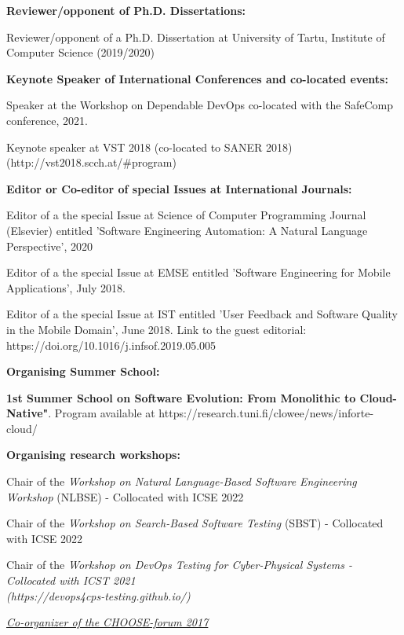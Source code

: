 \documentclass[10pt]{article}
\begin{document}
\textbf{Reviewer/opponent of Ph.D. Dissertations:}
\begin{innerlist}
\item Reviewer/opponent of a Ph.D. Dissertation  at University of Tartu, Institute of Computer Science (2019/2020) \\
	\end{innerlist}

\textbf{Keynote Speaker of International Conferences and co-located events:}
\begin{innerlist}
\item Speaker at the Workshop on Dependable DevOps co-located with the SafeComp conference, 2021.\\
\item Keynote speaker at VST 2018 (co-located to SANER 2018) \\(http://vst2018.scch.at/\#program) 
	\\
\end{innerlist}

\textbf{Editor or Co-editor of special Issues at International Journals:}
\begin{innerlist}
\item Editor of a the special Issue at Science of Computer Programming Journal (Elsevier)  entitled 'Software Engineering Automation: A Natural Language Perspective', 2020 
\item Editor of a the special Issue at EMSE entitled 'Software Engineering for Mobile Applications', July 2018.
\item Editor of a the special Issue at IST entitled 'User Feedback and Software Quality in the Mobile Domain',  June 2018. Link to the guest editorial:\\ https://doi.org/10.1016/j.infsof.2019.05.005
	\\
\end{innerlist}

\textbf{Organising Summer School:}
\begin{innerlist}
\item \textbf{1st Summer School on Software Evolution: From Monolithic to Cloud-Native"}. Program available at https://research.tuni.fi/clowee/news/inforte-cloud/ 
	\\
\end{innerlist}

\textbf{Organising research workshops:}
\begin{innerlist}
\item Chair of the \textit{Workshop on Natural Language-Based Software Engineering Workshop} (NLBSE) - Collocated with ICSE 2022
\item Chair of  the \textit{Workshop on Search-Based Software Testing} (SBST) - Collocated with ICSE 2022
\item Chair of the \textit{Workshop on DevOps Testing for Cyber-Physical Systems - Collocated with ICST 2021 \\(https://devops4cps-testing.github.io/)} 
\item \textit{\href{http://www.choose.s-i.ch/events/forum2017/index.html}{Co-organizer of the CHOOSE-forum 2017}} 
\end{innerlist}
\end{document}
